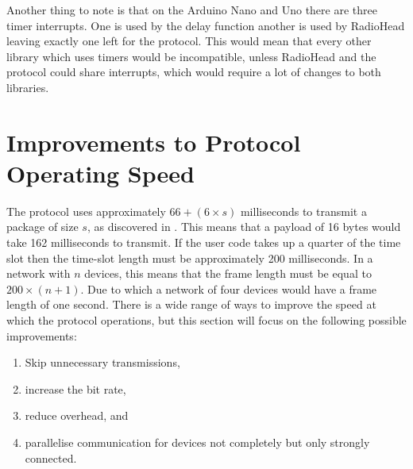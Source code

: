 Another thing to note is that on the Arduino Nano and Uno there are three timer interrupts.
One is used by the delay function another is used by RadioHead leaving exactly one left for the protocol.
This would mean that every other library which uses timers would be incompatible, unless RadioHead and the protocol could share interrupts, which would require a lot of changes to both libraries.

\section{Improvements to Protocol Operating Speed}

The protocol uses approximately $66 + (6 \times s)$ milliseconds to transmit a package of size $s$, as discovered in . 
This means that a payload of 16 bytes would take 162 milliseconds to transmit.
If the user code takes up a quarter of the time slot then the time-slot length must be approximately 200 milliseconds.
In a network with $n$ devices, this means that the frame length must be equal to $200 \times (n + 1)$.
Due to which a network of four devices would have a frame length of one second.
There is a wide range of ways to improve the speed at which the protocol operations, but this section will focus on the following possible improvements:
\begin{enumerate}[label=\itshape \alph*\upshape)]
    \item Skip unnecessary transmissions,
    \item increase the bit rate, 
    \item reduce overhead, and
    \item parallelise communication for devices not completely but only strongly connected.
\end{enumerate} 

